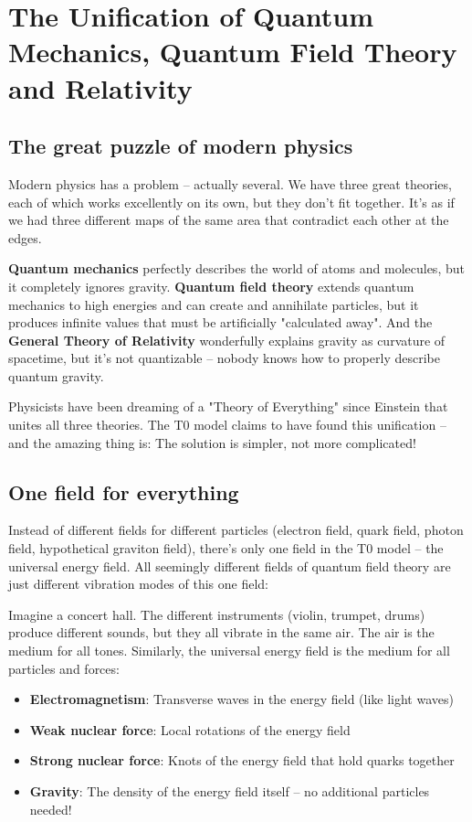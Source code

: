 \documentclass[12pt,a4paper]{article}
\begin{document}
	\section{The Unification of Quantum Mechanics, Quantum Field Theory and Relativity}
	
	\subsection{The great puzzle of modern physics}
	
	Modern physics has a problem -- actually several. We have three great theories, each of which works excellently on its own, but they don't fit together. It's as if we had three different maps of the same area that contradict each other at the edges.
	
	\textbf{Quantum mechanics} perfectly describes the world of atoms and molecules, but it completely ignores gravity. \textbf{Quantum field theory} extends quantum mechanics to high energies and can create and annihilate particles, but it produces infinite values that must be artificially "calculated away". And the \textbf{General Theory of Relativity} wonderfully explains gravity as curvature of spacetime, but it's not quantizable -- nobody knows how to properly describe quantum gravity.
	
	Physicists have been dreaming of a "Theory of Everything" since Einstein that unites all three theories. The T0 model claims to have found this unification -- and the amazing thing is: The solution is simpler, not more complicated!
	
	\subsection{One field for everything}
	
	Instead of different fields for different particles (electron field, quark field, photon field, hypothetical graviton field), there's only one field in the T0 model -- the universal energy field. All seemingly different fields of quantum field theory are just different vibration modes of this one field:
	
	\begin{important}
		Imagine a concert hall. The different instruments (violin, trumpet, drums) produce different sounds, but they all vibrate in the same air. The air is the medium for all tones. Similarly, the universal energy field is the medium for all particles and forces:
		\begin{itemize}
			\item \textbf{Electromagnetism}: Transverse waves in the energy field (like light waves)
			\item \textbf{Weak nuclear force}: Local rotations of the energy field
			\item \textbf{Strong nuclear force}: Knots of the energy field that hold quarks together
			\item \textbf{Gravity}: The density of the energy field itself -- no additional particles needed!
		\end{itemize}
	\end{important}
	
\end{document}
